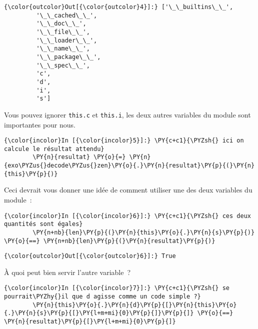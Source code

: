 \begin{Verbatim}[commandchars=\\\{\},frame=single,framerule=0.3mm,rulecolor=\color{cellframecolor}]
{\color{outcolor}Out[{\color{outcolor}4}]:} ['\_\_builtins\_\_',
         '\_\_cached\_\_',
         '\_\_doc\_\_',
         '\_\_file\_\_',
         '\_\_loader\_\_',
         '\_\_name\_\_',
         '\_\_package\_\_',
         '\_\_spec\_\_',
         'c',
         'd',
         'i',
         's']
\end{Verbatim}
            
    Vous pouvez ignorer \texttt{this.c} et \texttt{this.i}, les deux autres
variables du module sont importantes pour nous.

    \begin{Verbatim}[commandchars=\\\{\},frame=single,framerule=0.3mm,rulecolor=\color{cellframecolor}]
{\color{incolor}In [{\color{incolor}5}]:} \PY{c+c1}{\PYZsh{} ici on calcule le résultat attendu}
        \PY{n}{resultat} \PY{o}{=} \PY{n}{exo\PYZus{}decode\PYZus{}zen}\PY{o}{.}\PY{n}{resultat}\PY{p}{(}\PY{n}{this}\PY{p}{)}
\end{Verbatim}


    Ceci devrait vous donner une idée de comment utiliser une des deux
variables du module~:

    \begin{Verbatim}[commandchars=\\\{\},frame=single,framerule=0.3mm,rulecolor=\color{cellframecolor}]
{\color{incolor}In [{\color{incolor}6}]:} \PY{c+c1}{\PYZsh{} ces deux quantités sont égales}
        \PY{n+nb}{len}\PY{p}{(}\PY{n}{this}\PY{o}{.}\PY{n}{s}\PY{p}{)} \PY{o}{==} \PY{n+nb}{len}\PY{p}{(}\PY{n}{resultat}\PY{p}{)}
\end{Verbatim}


\begin{Verbatim}[commandchars=\\\{\},frame=single,framerule=0.3mm,rulecolor=\color{cellframecolor}]
{\color{outcolor}Out[{\color{outcolor}6}]:} True
\end{Verbatim}
            
    À quoi peut bien servir l'autre variable~?

    \begin{Verbatim}[commandchars=\\\{\},frame=single,framerule=0.3mm,rulecolor=\color{cellframecolor}]
{\color{incolor}In [{\color{incolor}7}]:} \PY{c+c1}{\PYZsh{} se pourrait\PYZhy{}il que d agisse comme un code simple ?}
        \PY{n}{this}\PY{o}{.}\PY{n}{d}\PY{p}{[}\PY{n}{this}\PY{o}{.}\PY{n}{s}\PY{p}{[}\PY{l+m+mi}{0}\PY{p}{]}\PY{p}{]} \PY{o}{==} \PY{n}{resultat}\PY{p}{[}\PY{l+m+mi}{0}\PY{p}{]}
\end{Verbatim}


